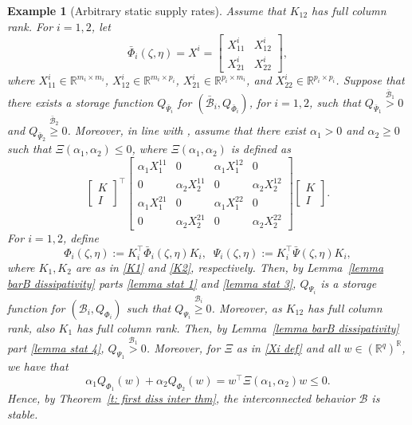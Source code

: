 \documentclass[letterpaper, 10 pt, conference]{ieeeconf}
\theoremstyle{ieeeconf}
\newtheorem{example}{Example}
\newcommand{\R}{\mathbb{R}}
\newcommand{\B}{\mathcal{B}}
\begin{document}
\begin{example}[Arbitrary static supply rates]
\label{ex: arbitrary sr}
Assume that $K_{12}$ has full column rank.
For $i=1,2$, let \[{\bar{\Phi}_i(\zeta,\eta)=X^i=\begin{bmatrix}
		X_{11}^i & X_{12}^i \\ X_{21}^i & X_{22}^i
\end{bmatrix}},\]
where $X_{11}^i\in \R^{m_i \times m_i}$, $X_{12}^i\in \R^{m_i \times p_i}$, $X_{21}^i\in \R^{p_i \times m_i}$, and $X_{22}^i\in \R^{p_i \times p_i}$. Suppose that there exists a storage function $Q_{\bar{\Psi}_i}$ for $(\bar{\B}_i,Q_{\bar{\Phi}_i})$, for $i=1,2$, such that $Q_{\bar{\Psi}_1}\stackrel{\bar{\B}_1}{>}0$ and  $Q_{\bar{\Psi}_2}\stackrel{\bar{\B}_2}{\geq}0$. Moreover, in line with \cite{arcak_stability_2016}, assume that there exist $\alpha_1>0$ and $\alpha_2\geq 0$ such that $\Xi(\alpha_1,\alpha_2)\leq0$, where $\Xi(\alpha_1,\alpha_2)$ is defined as
	\begin{equation}
		\begin{bmatrix}
			K \\ I
		\end{bmatrix}^\top \begin{bmatrix}
			\alpha_1X^{11}_1 & 0  &\alpha_1X_1^{12} & 0\\
			0 & \alpha_2 X_2^{11} & 0 & \alpha_2X_2^{12}\\
			\alpha_1X^{21}_1 & 0  &\alpha_1X_1^{22} & 0\\
			0 & \alpha_2 X_2^{21} & 0 & \alpha_2X_2^{22}
		\end{bmatrix}\begin{bmatrix}
			K \\ I
		\end{bmatrix}.
		\label{Xi def}
	\end{equation}
	For $i=1,2$, define
	\begin{equation}
		\Phi_i(\zeta,\eta):=K_i^\top \bar{\Phi}_i(\zeta,\eta)K_i, \;\; \Psi_i(\zeta,\eta):=K_i^\top \bar{\Psi}(\zeta,\eta)K_i,
		\label{bar Phi and bar Psi}
	\end{equation}
	where $K_1, K_2$ are as in \eqref{K1} and \eqref{K2}, respectively.
	Then, by Lemma~\ref{lemma barB dissipativity} parts \ref{lemma stat 1} and \ref{lemma stat 3}, $Q_{\Psi_i}$ is a storage function for $(\B_i,Q_{\Phi_i})$ such that $Q_{\Psi_i}\stackrel{\B_i}{\geq}0$. Moreover, as $K_{12}$ has full column rank, also $K_1$
	has full column rank. Then, by Lemma~\ref{lemma barB dissipativity} part \ref{lemma stat 4}, $Q_{\Psi_1}\stackrel{\B_1}{>}0$.  Moreover, for $\Xi$ as in \eqref{Xi def} and all $w\in \left(\R^q\right)^\R$, we have that 
	\begin{equation*}
		\alpha_1Q_{\Phi_1}(w)+\alpha_2Q_{\Phi_2}(w)= w^\top \Xi(\alpha_1,\alpha_2) w\leq 0.
	\end{equation*}
	Hence, by Theorem~\ref{t: first diss inter thm}, the interconnected behavior $\B$ is stable.
	

\end{example}
\end{document}
